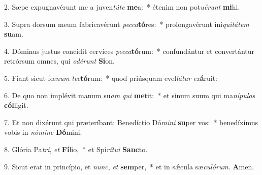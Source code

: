 2. Sæpe expugnavérunt me a juven\textit{tú}\textit{te} \textbf{me}a:~*  étenim non pot\textit{u}\textit{é}\textit{runt} \textbf{mi}hi.\

3. Supra dorsum meum fabricavérunt \textit{pec}\textit{ca}\textbf{tó}res:~*  prolongavérunt ini\textit{qui}\textit{tá}\textit{tem} \textbf{su}am.\

4. Dóminus justus concídit cervíces \textit{pec}\textit{ca}\textbf{tó}rum:~*  confundántur et convertántur retrórsum omnes, qui \textit{o}\textit{dé}\textit{runt} \textbf{Si}on.\

5. Fiant sicut fœ\textit{num} \textit{tec}\textbf{tó}rum:~*  quod priúsquam evel\textit{lá}\textit{tur} \textit{ex}\textbf{á}ruit:\

6. De quo non implévit manum su\textit{am} \textit{qui} \textbf{me}tit:~*  et sinum suum qui ma\textit{ní}\textit{pu}\textit{los} \textbf{cól}ligit.\

7. Et non dixérunt qui præteríbant: Benedíctio Dó\textit{mi}\textit{ni} \textbf{su}per vos:~*  benedíximus vobis in \textit{nó}\textit{mi}\textit{ne} \textbf{Dó}mini.\

8. Glória Pa\textit{tri}, \textit{et} \textbf{Fí}lio,~*  et Spi\textit{rí}\textit{tu}\textit{i} \textbf{Sanc}to.\

9. Sicut erat in princípio, et \textit{nunc}, \textit{et} \textbf{sem}per,~*  et in sǽcula sæ\textit{cu}\textit{ló}\textit{rum}. \textbf{A}men.\

